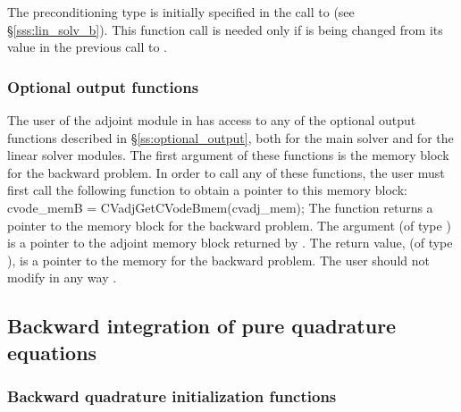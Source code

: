 {
  The preconditioning type is initially specified in the call
  to  (see \S\ref{sss:lin_solv_b}). This function call is
  needed only if  is being changed from its value in the
  previous call to .
}

\subsubsection{Optional output functions}
The user of the adjoint module in {\cvodes} has access to any of the optional output 
functions described in \S\ref{ss:optional_output}, both for the main solver and for
the linear solver modules. The first argument of these  functions is
the {\cvodes} memory block for the backward problem. In order to call any of these
functions, the user must first call the following function to obtain a pointer to
this memory block:
{
  cvode\_memB = CVadjGetCVodeBmem(cvadj\_mem);
}
{
  The function  returns a pointer to the {\cvodes}
  memory block for the backward problem.
}
{
  The argument  (of type ) is a pointer to the
  adjoint memory block returned by .
}
{
  The return value,  (of type ), is a pointer to the
  {\cvodes} memory for the backward problem.
}
{
  {\warn} The user should not modify in any way .
}

\subsection{Backward integration of pure quadrature equations}

\subsubsection{Backward quadrature initialization functions}\label{sss:cvodequadmallocb}


